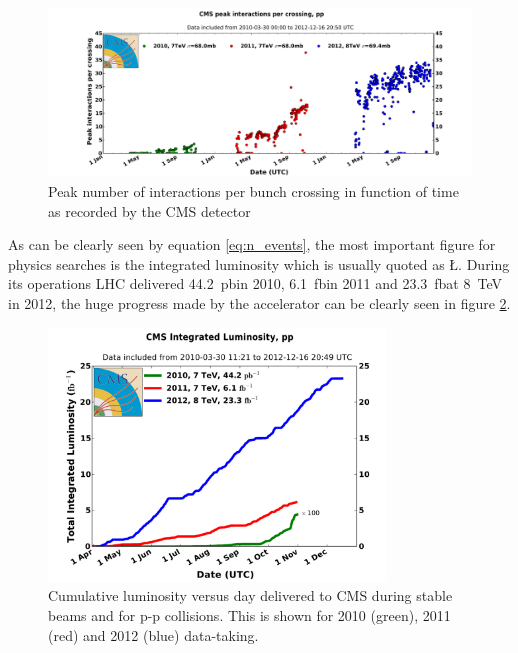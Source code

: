 \begin{figure}
\begin{center}
\includegraphics[angle=-0,width=\textwidth]{2_LHC_and_CMS/pics/peak_pu_pp.pdf}
\caption{Peak number of interactions per bunch crossing in function of time as recorded by the CMS detector
\label{fig:lhc_pileup}
}
\end{center}
\end{figure}

As can be clearly seen by equation \ref{eq:n_events}, the most important figure for physics searches is the integrated luminosity which is usually quoted as \L. During its operations LHC delivered 44.2~pb\Inv in 2010, 6.1~fb\Inv in 2011 and 23.3~fb\Inv at 8~TeV in 2012, the huge progress made by the accelerator can be clearly seen in figure \ref{fig:int_lumi}.

\begin{figure}
\begin{center}
\includegraphics[angle=-0,width=0.8\textwidth]{2_LHC_and_CMS/pics/int_lumi.pdf}
\caption{Cumulative luminosity versus day delivered to CMS during stable beams and for p-p collisions. This is shown for 2010 (green), 2011 (red) and 2012 (blue) data-taking.
\label{fig:int_lumi}
}
\end{center}
\end{figure}


